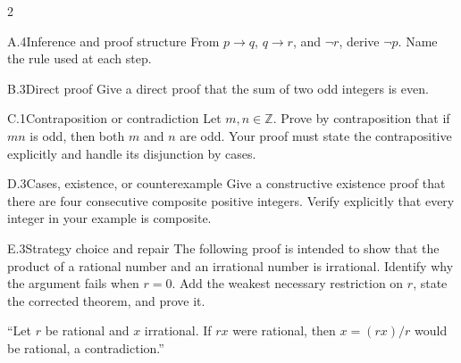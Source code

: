 \documentclass[9pt]{extarticle}
\begin{document}
\begin{multicols}{2}
\begin{CoreProblem}{A.4}{Inference and proof structure}
From $p\to q$, $q\to r$, and $\neg r$, derive $\neg p$. Name the rule used at
each step.
\end{CoreProblem}
\begin{CoreProblem}{B.3}{Direct proof}
Give a direct proof that the sum of two odd integers is even.
\end{CoreProblem}
\begin{CoreProblem}{C.1}{Contraposition or contradiction}
Let $m,n\in\mathbb Z$. Prove by contraposition that if $mn$ is odd, then both
$m$ and $n$ are odd. Your proof must state the contrapositive explicitly and
handle its disjunction by cases.
\end{CoreProblem}
\columnbreak
\begin{CoreProblem}{D.3}{Cases, existence, or counterexample}
Give a constructive existence proof that there are four consecutive composite
positive integers. Verify explicitly that every integer in your example is
composite.
\end{CoreProblem}
\begin{CoreProblem}{E.3}{Strategy choice and repair}
The following proof is intended to show that the product of a rational number
and an irrational number is irrational. Identify why the argument fails when
$r=0$. Add the weakest necessary restriction on $r$, state the corrected
theorem, and prove it.

``Let $r$ be rational and $x$ irrational. If $rx$ were rational, then $x=(rx)/r$ would be rational, a contradiction.''
\end{CoreProblem}
\end{multicols}
\CoreWorkArea
\FormBreak
{}
\end{document}
